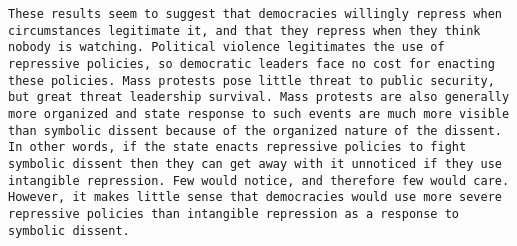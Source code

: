 \documentclass[ignorenonframetext,]{beamer}
\begin{document}
\begin{frame}[fragile]
\begin{verbatim}
These results seem to suggest that democracies willingly repress when circumstances legitimate it, and that they repress when they think nobody is watching. Political violence legitimates the use of repressive policies, so democratic leaders face no cost for enacting these policies. Mass protests pose little threat to public security, but great threat leadership survival. Mass protests are also generally more organized and state response to such events are much more visible than symbolic dissent because of the organized nature of the dissent. In other words, if the state enacts repressive policies to fight symbolic dissent then they can get away with it unnoticed if they use intangible repression. Few would notice, and therefore few would care. However, it makes little sense that democracies would use more severe repressive policies than intangible repression as a response to symbolic dissent. 
\end{verbatim}


\end{frame}
\end{document}
